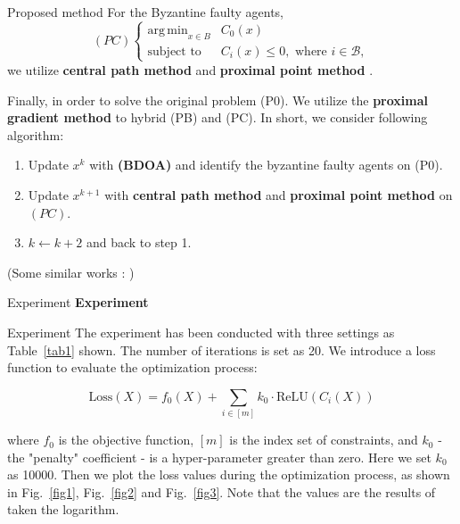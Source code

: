 \documentclass{beamer}
\DeclareMathOperator*{\argmin}{arg\,min}
\begin{document}
\begin{frame}{Proposed method}
 For the Byzantine faulty agents,
 $$
(PC)
\begin{cases}
    \argmin_{x\in B} &C_0(x)\\
    \text{subject to} &C_i(x) \leq 0, \text{ where } i \in \mathcal{B},
\end{cases}
$$
we utilize \textbf{central path method} and \textbf{proximal point method} \cite{boyd2004convex}.
\newline

Finally, in order to solve the original problem (P0). We utilize the \textbf{proximal gradient method} \cite{boyd2004convex} to hybrid (PB) and (PC). In short, we consider following algorithm:
\begin{enumerate}
    \item Update $x^k$ with \textbf{(BDOA)} and identify the byzantine faulty agents on (P0).
    \item Update $x^{k+1}$ with \textbf{central path method} and \textbf{proximal point method} on $(PC)$.
    \item $k\leftarrow k+2$ and back to step 1.
\end{enumerate}

(Some similar works : \cite{li2010hybrid, xu2022resilient})
\end{frame}

\begin{frame}{Experiment}
    \centering
    \textbf{Experiment}
\end{frame}

\begin{frame}{Experiment}
     The experiment has been conducted with three settings as Table~\ref{tab1} shown. The number of iterations is set as 20. We introduce a loss function to evaluate the optimization process:
     
    \begin{equation*}
        \text{Loss}(X) = f_{0}(X) + \sum_{i \in [m]} k_0 \cdot \text{ReLU}(C_{i}(X))
    \end{equation*}
    
    where $f_{0}$ is the objective function, $[m]$ is the index set of constraints, and $k_0$ - the "penalty" coefficient - is a hyper-parameter greater than zero. Here we set $k_0$ as 10000. Then we plot the loss values during the optimization process, as shown in Fig.~\ref{fig1}, Fig.~\ref{fig2} and Fig.~\ref{fig3}. Note that the values are the results of taken the logarithm.
\end{frame}
\end{document}
